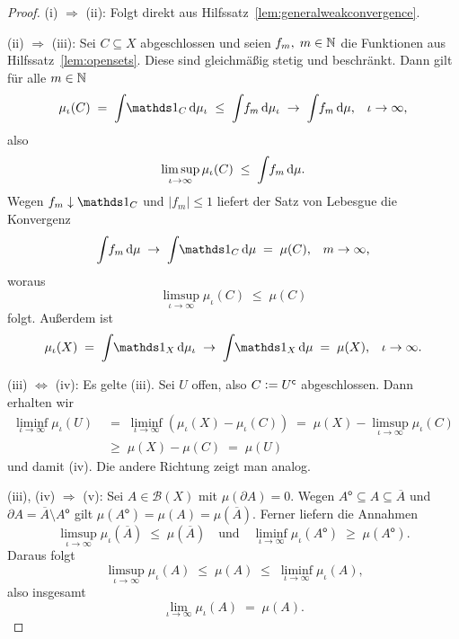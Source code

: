 \documentclass[../main/main.tex]{subfiles}
\begin{document}
	\begin{proof}
		(i) $\Rightarrow$ (ii): Folgt direkt aus Hilfssatz~\ref{lem:generalweakconvergence}. 
		
		(ii) $\Rightarrow$ (iii): Sei $C \subseteq X$ abgeschlossen und seien 
		$f_m, \; m \in \mathbb{N}$ die Funktionen aus Hilfssatz~\ref{lem:opensets}. 
		Diese sind gleichmäßig stetig und beschränkt.
		Dann gilt für alle $m \in \mathbb{N}$
		$$\mu_\iota(C) \; = \; \measureint{}{\indfct_C}{\mu_\iota} \; \leq \; 
		\measureint{}{f_m}{\mu_\iota} \; \to \;
		\measureint{}{f_m}{\mu} \text{,} \quad \iota \to \infty \text{,}$$
		also 
		$$\limsup_{\iota \to \infty} \mu_\iota(C) \; \leq \; 
		\int_{} \, f_m \, \mathrm{d}\mu \text{.}$$
		Wegen $f_m \convdown \indfct_C$ und $| f_m | \leq 1$ 
		liefert der Satz von Lebesgue die Konvergenz
		$$\measureint{}{f_m}{\mu} \; \to \;
		\measureint{}{\indfct_C}{\mu} \; = \; \mu(C) \text{,} 
		\quad m \to \infty \text{,}$$
		woraus
		$$\limsup_{\iota \to \infty} \mu_\iota(C) \; \leq \; \mu(C)$$
		folgt. Außerdem ist 
		$$\mu_\iota(X) \; = \; \measureint{}{\indfct_{X}}{\mu_\iota} \; \to \; \measureint{}{\indfct_{X}}{\mu} \; = \; \mu(X) \text{,} 
		\quad \iota \to \infty \text{.}$$
		
		(iii) $\Leftrightarrow$ (iv): Es gelte (iii). Sei $U$ offen, also 
		$C \vcentcolon = U^\mathsf{c}$ abgeschlossen. Dann erhalten wir
		\begin{align*}
			\liminf_{\iota \to \infty} \mu_\iota(U) \; &= \; \liminf_{\iota \to \infty} (\mu_\iota(X) - \mu_\iota(C)) \; = \;
			\mu(X) - \limsup_{\iota \to \infty} \mu_\iota(C) \\
			&\geq \; 
			\mu(X) - \mu(C) \; = \; \mu(U)
		\end{align*}
		und damit (iv). Die andere Richtung zeigt man analog.
		
		(iii), (iv) $\Rightarrow$ (v): Sei $A \in \mathcal{B}(X)$ mit 
		$\mu(\partial A) = 0$. Wegen
		$A^\mathsf{o} \subseteq A \subseteq \overline{A}$ und 
		$\partial A = \overline{A} \setminus A^\mathsf{o}$ gilt $\mu(A^\mathsf{o}) = 
		\mu(A) = \mu(\overline{A}) \text{.}$
		Ferner liefern die Annahmen
		$$\limsup_{\iota \to \infty} \mu_\iota(\overline{A}) \; \leq \; 
		\mu(\overline{A}) \quad \text{und} \quad 
		\liminf_{\iota \to \infty} \mu_\iota(A^\mathsf{o}) \; \geq \; 
		\mu(A^\mathsf{o}) \text{.}$$
		Daraus folgt
		$$\limsup_{\iota \to \infty} \mu_\iota(A) \; \leq \; 
		\mu(A) \; \leq \; \liminf_{\iota \to \infty} \mu_\iota(A) \text{,}$$
		also insgesamt
		$$\lim_{\iota \to \infty} \mu_\iota(A) \; = \; \mu(A) \text{.}$$
		

\end{proof}
\end{document}
